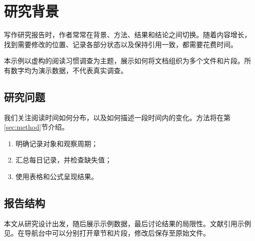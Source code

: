 \section{研究背景}\label{sec:intro}
写作研究报告时，作者常常在背景、方法、结果和结论之间切换。随着内容增长，找到需要修改的位置、记录各部分状态以及保持引用一致，都需要花费时间。

本示例以虚构的阅读习惯调查为主题，展示如何将文档组织为多个文件和片段。所有数字均为演示数据，不代表真实调查。
\subsection{研究问题}
我们关注阅读时间如何分布，以及如何描述一段时间内的变化。方法将在第\ref{sec:method}节介绍。
\begin{enumerate}
\item 明确记录对象和观察周期；
\item 汇总每日记录，并检查缺失值；
\item 使用表格和公式呈现结果。
\end{enumerate}
\subsection{报告结构}
本文从研究设计出发，随后展示示例数据，最后讨论结果的局限性。文献引用示例见\cite{knuth1984}。在导航台中可以分别打开章节和片段，修改后保存至原始文件。
